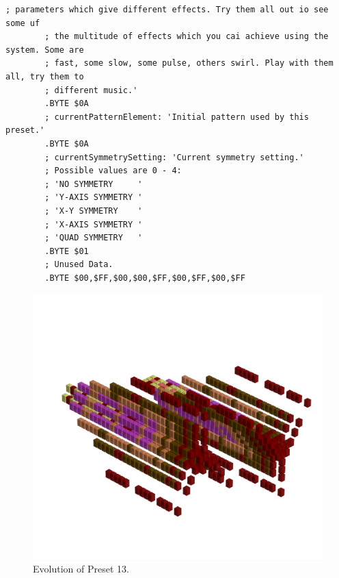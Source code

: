 \begin{lstlisting}[basicstyle=\tiny,caption=Source code for Preset 12.]
        ; parameters which give different effects. Try them all out io see some uf
        ; the multitude of effects which you cai achieve using the system. Some are
        ; fast, some slow, some pulse, others swirl. Play with them all, try them to
        ; different music.'
        .BYTE $0A
        ; currentPatternElement: 'Initial pattern used by this preset.'
        .BYTE $0A
        ; currentSymmetrySetting: 'Current symmetry setting.'
        ; Possible values are 0 - 4:
        ; 'NO SYMMETRY     '
        ; 'Y-AXIS SYMMETRY '
        ; 'X-Y SYMMETRY    '
        ; 'X-AXIS SYMMETRY '
        ; 'QUAD SYMMETRY   '
        .BYTE $01
        ; Unused Data.
        .BYTE $00,$FF,$00,$00,$FF,$00,$FF,$00,$FF
\end{lstlisting}


\clearpage                                                                 
\begin{figure}[H]                                                          
    \centering                                                             
    \begin{adjustbox}{width=14cm,center}                                   
      \includegraphics[width=14cm]{src/presets/pattern13-45.png}%
    \end{adjustbox}                                                        
\caption{Evolution of Preset 13.}                                           
\end{figure}                                                               
\clearpage                                                                 
                                                                           
